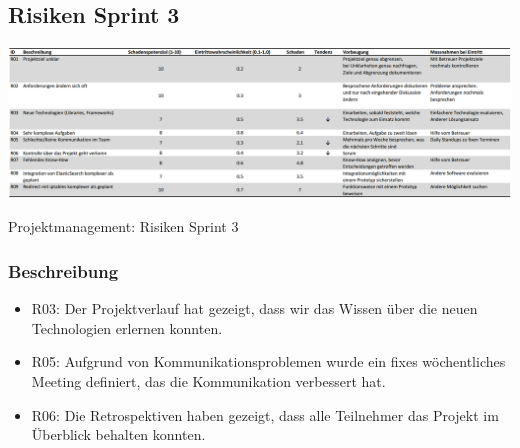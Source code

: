 \begin{landscape}
  \subsection{Risiken Sprint 3}
  	\begin{table}[H]		
		\includegraphics[width=\linewidth, keepaspectratio]{risiken/Risiken-Sprint-3.png}
		\caption{Projektmanagement: Risiken Sprint 3}
	\end{table}

	\subsubsection{Beschreibung}
	\begin{itemize}
		\item R03: Der Projektverlauf hat gezeigt, dass wir das Wissen über die neuen Technologien erlernen konnten.
		\item R05: Aufgrund von Kommunikationsproblemen wurde ein fixes wöchentliches Meeting definiert, das die Kommunikation verbessert hat.
		\item R06: Die Retrospektiven haben gezeigt, dass alle Teilnehmer das Projekt im Überblick behalten konnten.
	\end{itemize}		
	
  	\vfill
\end{landscape}

